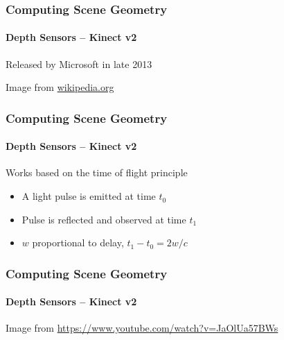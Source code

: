 \documentclass[xetex,professionalfont]{beamer}
\begin{document}
\begin{frame}
\frametitle{Computing Scene Geometry}
\framesubtitle{Depth Sensors -- Kinect v2}

Released by Microsoft in late 2013

\begin{center}
    {\centering Image from \url{wikipedia.org}}
\end{center}

\end{frame}


\begin{frame}
\frametitle{Computing Scene Geometry}
\framesubtitle{Depth Sensors -- Kinect v2}

Works based on the time of flight principle
\begin{itemize}
    \item A light pulse is emitted at time $t_0$
    \item Pulse is reflected and observed at time $t_1$
    \item $w$ proportional to delay, $t_1-t_0=2w/c$ %
\end{itemize}


\end{frame}


\begin{frame}
\frametitle{Computing Scene Geometry}
\framesubtitle{Depth Sensors -- Kinect v2}

\begin{center}
    {\centering Image from \url{https://www.youtube.com/watch?v=JaOlUa57BWs}}
\end{center}

\end{frame}
\end{document}
